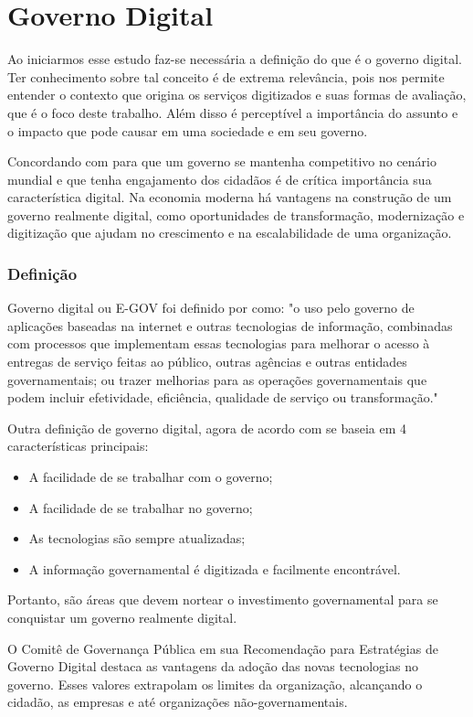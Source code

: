 \chapter[Governo Digital]{Governo Digital}
Ao iniciarmos esse estudo faz-se necessária a definição do que é o governo digital. Ter conhecimento sobre tal conceito é de extrema relevância, pois nos permite entender o contexto que origina os serviços digitizados e suas formas de avaliação, que é o foco deste trabalho. Além disso é perceptível a importância do assunto e o impacto que pode causar em uma sociedade e em seu governo.

Concordando com \cite{itac2016} para que um governo se mantenha competitivo no cenário mundial e que tenha engajamento dos cidadãos é de crítica importância sua característica digital. Na economia moderna há vantagens na construção de um governo realmente digital, como oportunidades de transformação, modernização e digitização que ajudam no crescimento e na escalabilidade de uma organização.

\subsection{Definição}
Governo digital ou E-GOV foi definido por \cite[p.~2902]{act2002} como: "o uso pelo governo de aplicações baseadas na internet e outras tecnologias de informação, combinadas com processos que implementam essas tecnologias para melhorar o acesso à entregas de serviço feitas ao público, outras agências e outras entidades governamentais; ou trazer melhorias para as operações governamentais que podem incluir efetividade, eficiência, qualidade de serviço ou transformação."

Outra definição de governo digital, agora de acordo com \cite{itac2016} se baseia em 4 características principais:
\begin{itemize}
	\item A facilidade de se trabalhar com o governo;
	\item A facilidade de se trabalhar no governo;
	\item As tecnologias são sempre atualizadas;
	\item A informação governamental é digitizada e facilmente encontrável.
\end{itemize}

Portanto, são áreas que devem nortear o investimento governamental para se conquistar um governo realmente digital.
 
O Comitê de Governança Pública em sua Recomendação para Estratégias de Governo Digital \cite{oecd2014} destaca as vantagens da adoção das novas tecnologias no governo. Esses valores extrapolam os limites da organização, alcançando o cidadão, as empresas e até organizações não-governamentais. 

